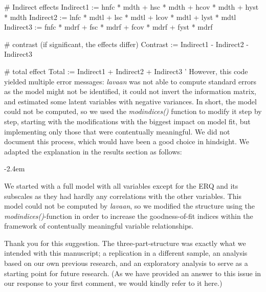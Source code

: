 \documentclass[draft]{article}
\renewenvironment{quote}{\begin{fquote}\advance\leftmargini -2.4em\begin{oldquote}}{\end{oldquote}\end{fquote}}
\newenvironment{fquote}
  {\def\FrameCommand{
	\fboxsep=0.6em %
	\fcolorbox{black}{white}}%
    \MakeFramed {\advance\hsize-2\width \FrameRestore}
    \begin{minipage}{\linewidth}
  }
  {\end{minipage}\endMakeFramed}
\begin{document}
\# Indirect effects
Indirect1 := hnfc * mdth + hsc * mdth + hcov * mdth + hyst * mdth
Indirect2 := lnfc * mdtl + lsc * mdtl + lcov * mdtl + lyst * mdtl
Indirect3 := fnfc * mdrf + fsc * mdrf + fcov * mdrf + fyst * mdrf

\# contrast (if significant, the effects differ)
Contrast := Indirect1 - Indirect2 - Indirect3

\# total effect
Total := Indirect1 + Indirect2 + Indirect3
'
However, this code yielded multiple error messages: \emph{lavaan} was not able to compute standard errors as the model might not be identified, it could not invert the information matrix, and estimated some latent variables with negative variances.
In short, the model could not be computed, so we used the \emph{modindices()} function to modify it step by step, starting with the modifications with the biggest impact on model fit, but implementing only those that were contentually meaningful.
We did not document this process, which would have been a good choice in hindsight.
We adapted the explanation in the results section as follows:

\begin{quote}
We started with a full model with all variables except for the ERQ and its subscales as they had hardly any correlations with the other variables. This model could not be computed by \emph{lavaan}, so we modified the structure using the \emph{modindices()}-function in order to increase the goodness-of-fit indices within the framework of contentually meaningful variable relationships.
\end{quote}


Thank you for this suggestion.
The three-part-structure was exactly what we intended with this manuscript; a replication in a different sample, an analysis based on our own previous research, and an exploratory analysis to serve as a starting point for future research.
(As we have provided an answer to this issue in our response to your first comment, we would kindly refer to it here.)
\end{document}
